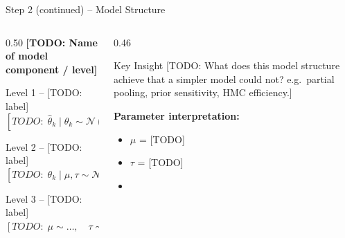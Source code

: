 \documentclass[aspectratio=169,11pt]{beamer}
\begin{document}
\begin{frame}{Step 2 (continued) -- Model Structure}


  \begin{columns}[T]
    \begin{column}{0.50\textwidth}
      \textbf{[TODO: Name of model component / level]}
      \vspace{4pt}
      \begin{exampleblock}{\small Level 1 -- [TODO: label]}
        \small
        $[TODO:\;\hat{\theta}_k \mid \theta_k
          \sim \mathcal{N}(\theta_k,\,\sigma_k^2)]$
      \end{exampleblock}
      \vspace{2pt}
      \begin{exampleblock}{\small Level 2 -- [TODO: label]}
        \small
        $[TODO:\;\theta_k \mid \mu,\tau
          \sim \mathcal{N}(\mu,\,\tau^2)]$
      \end{exampleblock}
      \vspace{2pt}
      \begin{exampleblock}{\small Level 3 -- [TODO: label]}
        \small
        $[TODO:\;\mu \sim \ldots,\quad \tau \sim \ldots]$
      \end{exampleblock}
    \end{column}
    \begin{column}{0.46\textwidth}
      \begin{block}{Key Insight}
        \small
        [TODO: What does this model structure achieve that a simpler
        model could not? e.g.\ partial pooling, prior sensitivity,
        HMC efficiency.]
      \end{block}
      \vspace{5pt}
      \textbf{Parameter interpretation:}
      \begin{itemize}\small
        \item $\mu$ = [TODO]
        \item $\tau$ = [TODO]
        \item [TODO: other parameters]
      \end{itemize}
    \end{column}
  \end{columns}

\end{frame}
\end{document}
